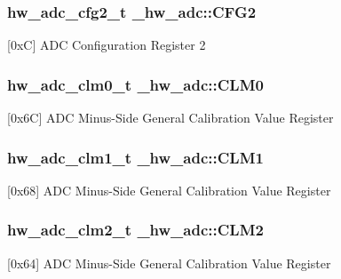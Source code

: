 \subsubsection[{\texorpdfstring{C\+F\+G2}{CFG2}}]{ {\bf hw\+\_\+adc\+\_\+cfg2\+\_\+t} \+\_\+hw\+\_\+adc\+::\+C\+F\+G2}\hypertarget{struct__hw__adc_afb4756c11d123acdda0385371478f5ed}{}\label{struct__hw__adc_afb4756c11d123acdda0385371478f5ed}
\mbox{[}0xC\mbox{]} A\+DC Configuration Register 2 
\subsubsection[{\texorpdfstring{C\+L\+M0}{CLM0}}]{ {\bf hw\+\_\+adc\+\_\+clm0\+\_\+t} \+\_\+hw\+\_\+adc\+::\+C\+L\+M0}\hypertarget{struct__hw__adc_af5fa35e4bd18dc84579ab900ea0e8dcb}{}\label{struct__hw__adc_af5fa35e4bd18dc84579ab900ea0e8dcb}
\mbox{[}0x6C\mbox{]} A\+DC Minus-\/\+Side General Calibration Value Register 
\subsubsection[{\texorpdfstring{C\+L\+M1}{CLM1}}]{ {\bf hw\+\_\+adc\+\_\+clm1\+\_\+t} \+\_\+hw\+\_\+adc\+::\+C\+L\+M1}\hypertarget{struct__hw__adc_a896fd830a70731d0a8db21d7f65c3cbb}{}\label{struct__hw__adc_a896fd830a70731d0a8db21d7f65c3cbb}
\mbox{[}0x68\mbox{]} A\+DC Minus-\/\+Side General Calibration Value Register 
\subsubsection[{\texorpdfstring{C\+L\+M2}{CLM2}}]{ {\bf hw\+\_\+adc\+\_\+clm2\+\_\+t} \+\_\+hw\+\_\+adc\+::\+C\+L\+M2}\hypertarget{struct__hw__adc_abb34fd6c80ea526543d3f84fe9836e0d}{}\label{struct__hw__adc_abb34fd6c80ea526543d3f84fe9836e0d}
\mbox{[}0x64\mbox{]} A\+DC Minus-\/\+Side General Calibration Value Register 
